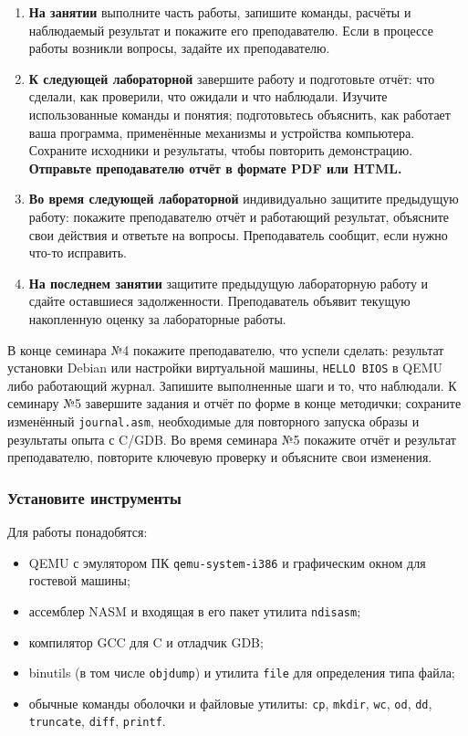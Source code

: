 \begin{enumerate}
\def\labelenumi{\arabic{enumi}.}
\tightlist
\item
  \textbf{На занятии} выполните часть работы, запишите команды, расчёты
  и наблюдаемый результат и покажите его преподавателю. Если в процессе
  работы возникли вопросы, задайте их преподавателю.
\item
  \textbf{К следующей лабораторной} завершите работу и подготовьте
  отчёт: что сделали, как проверили, что ожидали и что наблюдали.
  Изучите использованные команды и понятия; подготовьтесь объяснить,
  как работает ваша программа, применённые механизмы и устройства компьютера.
  Сохраните исходники и результаты, чтобы повторить демонстрацию.
  \textbf{Отправьте преподавателю отчёт в формате PDF или HTML.}
\item
  \textbf{Во время следующей лабораторной} индивидуально защитите
  предыдущую работу: покажите преподавателю отчёт и работающий
  результат, объясните свои действия и ответьте на вопросы. Преподаватель
  сообщит, если нужно что-то исправить.
\item
  \textbf{На последнем занятии} защитите предыдущую лабораторную работу
  и сдайте оставшиеся задолженности. Преподаватель объявит текущую
  накопленную оценку за лабораторные работы.
\end{enumerate}

В конце семинара №4 покажите преподавателю, что успели сделать:
результат установки Debian или настройки виртуальной машины,
\texttt{HELLO\ BIOS} в QEMU либо работающий журнал. Запишите выполненные
шаги и то, что наблюдали. К семинару №5 завершите задания и отчёт по
форме в конце методички; сохраните изменённый \texttt{journal.asm},
необходимые для повторного запуска образы и результаты опыта с C/GDB.
Во время семинара №5 покажите отчёт
и результат преподавателю, повторите ключевую проверку и объясните свои
изменения.

\hypertarget{ux443ux441ux442ux430ux43dux43eux432ux438ux442ux435-ux438ux43dux441ux442ux440ux443ux43cux435ux43dux442ux44b}{%
\subsubsection{Установите
инструменты}\label{ux443ux441ux442ux430ux43dux43eux432ux438ux442ux435-ux438ux43dux441ux442ux440ux443ux43cux435ux43dux442ux44b}}

Для работы понадобятся:

\begin{itemize}
\tightlist
\item
  QEMU с эмулятором ПК \texttt{qemu-system-i386} и графическим окном для
  гостевой машины;
\item
  ассемблер NASM и входящая в его пакет утилита \texttt{ndisasm};
\item
  компилятор GCC для C и отладчик GDB;
\item
  binutils (в том числе \texttt{objdump}) и утилита \texttt{file} для
  определения типа файла;
\item
  обычные команды оболочки и файловые утилиты: \texttt{cp},
  \texttt{mkdir}, \texttt{wc}, \texttt{od}, \texttt{dd},
  \texttt{truncate}, \texttt{diff}, \texttt{printf}.
\end{itemize}

